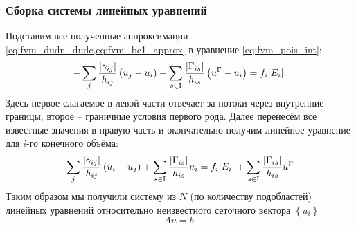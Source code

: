 \subsubsection{Сборка системы линейных уравнений}
Подставим все полученные аппроксимации
\cref{eq:fvm_dudn_dudc,eq:fvm_bc1_approx}
в уравнение \cref{eq:fvm_pois_int}:
\begin{equation*}
-\sum_j
    \frac{|\gamma_{ij}|}{h_{ij}}
         \left(u_j - u_i\right)
-\sum_{s\in{\rm I}}
    \frac{|\Gamma_{is}|}{h_{is}}
        \left(u^\Gamma - u_i\right)
=
f_i |E_i|.
\end{equation*}
Здесь первое слагаемое в левой части отвечает за потоки через внутренние границы,
второе -- граничные условия первого рода.
Далее перенесём все известные значения в правую часть и окончательно
получим линейное уравнение для $i$-го конечного объёма:
\begin{equation}
\label{eq:fvm_slae}
\sum_j
    \frac{|\gamma_{ij}|}{h_{ij}}
         \left(u_i - u_j\right)
+\sum_{s\in{\rm I}}
    \frac{|\Gamma_{is}|}{h_{is}}u_i
 =
f_i |E_i|
+\sum_{s\in{\rm I}}
    \frac{|\Gamma_{is}|}{h_{is}} u^\Gamma
\end{equation}
Таким образом мы получили систему из $N$ (по количеству подобластей) линейных уравнений относительно
неизвестного сеточного вектора $\left\{u_i\right\}$
$$
A u = b.
$$

